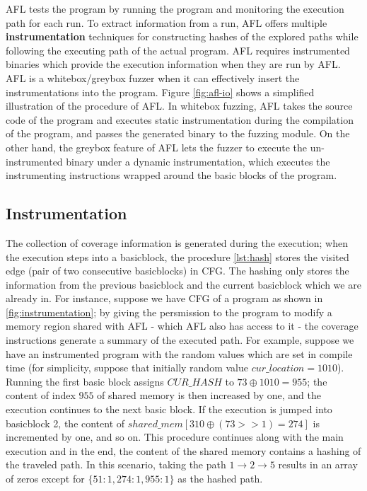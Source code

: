 AFL tests the program by running the program and monitoring the execution path for each run. To extract information from a run, AFL offers multiple \textbf{instrumentation} techniques for constructing hashes of the explored paths while following the executing path of the actual program. AFL requires instrumented binaries which provide the execution information when they are run by AFL. AFL is a whitebox/greybox fuzzer when it can effectively insert the instrumentations into the program. Figure \ref{fig:afl-io} shows a simplified illustration of the procedure of AFL. In whitebox fuzzing, AFL takes the source code of the program and executes static instrumentation during the compilation of the program, and passes the generated binary to the fuzzing module. On the other hand, the greybox feature of AFL lets the fuzzer to execute the un-instrumented binary under a dynamic instrumentation, which executes the instrumenting instructions wrapped around the basic blocks of the program.


\subsection{Instrumentation}
\label{subsec:instrumentation}

The collection of coverage information is generated during the execution; when the execution steps into a basicblock, the procedure \ref{lst:hash} stores the visited edge (pair of two consecutive basicblocks) in CFG. The hashing only stores the information from the previous basicblock and the current basicblock which we are already in. For instance, suppose we have CFG of a program as shown in \ref{fig:instrumentation}; by giving the persmission to the program to modify a memory region shared with AFL - which AFL also has access to it - the coverage instructions generate a summary of the executed path. For example, suppose we have an instrumented program with the random values which are set in compile time (for simplicity, suppose that initially random value $cur\_location=1010$). Running the first basic block assigns $CUR\_HASH$ to $73\oplus1010=955$; the content of index $955$ of shared memory is then increased by one, and the execution continues to the next basic block. If the execution is jumped into basicblock 2, the content of $shared\_mem[310\oplus(73>>1)=274]$ is incremented by one, and so on. This procedure continues along with the main execution and in the end, the content of the shared memory contains a hashing of the traveled path. In this scenario, taking the path $1\rightarrow2\rightarrow5$ results in an array of zeros except for $\{51: 1, 274: 1, 955: 1\}$ as the hashed path.

